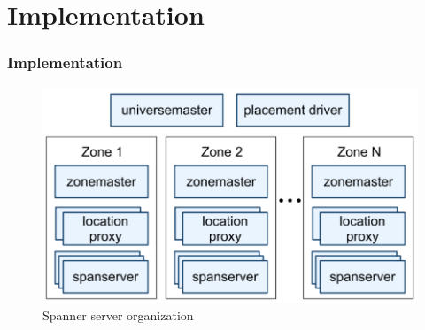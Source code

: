 \documentclass{beamer}
\begin{document}
\section{Implementation}
\begin{frame}
  \frametitle{Implementation}
    \begin{figure}
      \centering
      \includegraphics[width=.8\textwidth]{figures/spanner-server-organization.png}
      \caption{Spanner server organization}
    \end{figure}
\end{frame}
\end{document}
